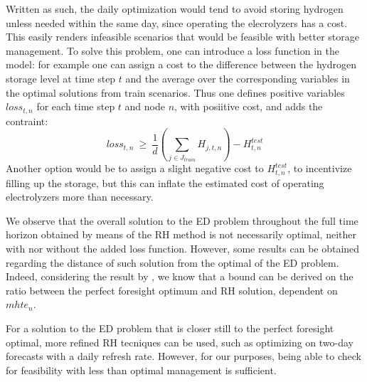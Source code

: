 Written as such, the daily optimization would tend to avoid storing hydrogen unless needed within the same day, since operating the elecrolyzers has a cost. 
This easily renders infeasible scenarios that would be feasible with better storage management. 
To solve this problem, one can introduce a loss function in the model: for example one can assign a cost to the difference between the hydrogen storage level at time step $t$ and the average over the corresponding variables in the optimal solutions from train scenarios. 
Thus one defines positive variables $loss_{t,n}$ for each time step $t$ and node $n$, with posiitive cost, and adds the contraint:
\begin{equation}
loss_{t,n}\ \ge\ \frac{1}{d}\left(\sum_{j\in J_{train}}H_{j,t,n}\right) - H^{test}_{t,n} 
\end{equation}
Another option would be to assign a slight negative cost to $H^{test}_{t,n}$, to incentivize filling up the storage, but this can inflate the estimated cost of operating electrolyzers more than necessary.


We observe that the overall solution to the ED problem throughout the full time horizon obtained by means of the RH method is not necessarily optimal, neither with nor without the added loss function. 
However, some results can be obtained regarding the distance of such solution from the optimal of the ED problem. 
Indeed, considering the result by \textcolor{green}{\cite{INTRO_Glomb}}, we know that a bound can be derived on the ratio between the perfect foresight optimum and RH solution, dependent on $mhte_n$.

For a solution to the ED problem that is closer still to the perfect foresight optimal, more refined RH tecniques can be used, such as optimizing on two-day forecasts with a daily refresh rate.
However, for our purposes, being able to check for feasibility with less than optimal management is sufficient.



















